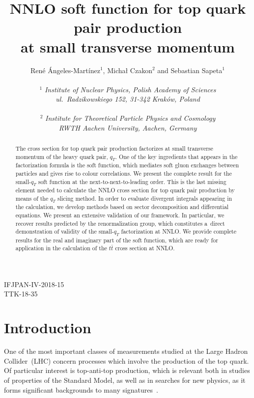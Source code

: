 \documentclass[a4paper,11pt]{article}
\title{
\vskip 40pt
NNLO soft function for top quark pair production \\
at small transverse momentum
}
\author{
  Ren\'e \'Angeles-Mart\'inez$^{1}$,  Michał Czakon$^{2}$ and
  Sebastian Sapeta$^{1}$ \\\\
  $^1$ {\it Institute of Nuclear Physics, Polish Academy of Sciences} \\
       {\it ul.\ Radzikowskiego 152, 31-342 Krak\'ow, Poland}\\\\
  $^2$ {\it Institute for Theoretical Particle Physics and Cosmology}\\
       {\it RWTH Aachen University, Aachen, Germany}
}
\date{}
\numberwithin{equation}{section}
\begin{document}
\maketitle

\thispagestyle{empty}

\vspace{-28em}
\begin{flushright}
  IFJPAN-IV-2018-15\\
  TTK-18-35
\end{flushright}

\vspace{25em}

\begin{abstract}
The cross section for top quark pair production factorizes at small transverse
momentum of the heavy quark pair, $q_T$. One of the key ingredients that appears
in the factorization formula is the soft function, which mediates soft gluon
exchanges between particles and gives rise to colour correlations.
%
We present the complete result for the small-$q_T$ soft
function at the next-to-next-to-leading order. This is the last missing
element needed to calculate the NNLO cross section for top quark pair
production by means of the $q_T$ slicing method.
%
In order to evaluate divergent integrals appearing in the calculation, we
develop methods based on sector decomposition and differential equations. 
%
We present an extensive validation of our framework. In particular, we recover
results predicted by the renormalization group, which constitutes a~direct
demonstration of validity of the small-$q_T$ factorization at NNLO. 
%
We provide complete results for the real and imaginary part of the soft
function, which are ready for application in the calculation of the $t\bar t$
cross section at NNLO.
\end{abstract}


\newpage
\setcounter{tocdepth}{2}
\tableofcontents

\section{Introduction}

One of the most important classes of measurements studied at the Large Hadron
Collider~(LHC) concern processes which involve the production of the top quark. Of
particular interest is top-anti-top production, which is relevant both in studies of
properties of the Standard Model, as well as in searches for new physics, as it
forms significant backgrounds to many signatures~\cite{Husemann:2017eka}.
\end{document}
